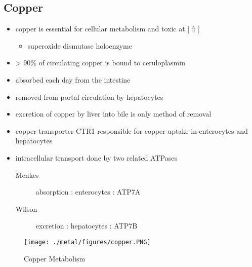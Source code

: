 \documentclass{scrartcl}
\begin{document}
\subsection{Copper}
\label{sec:org5c37294}
\begin{itemize}
\item copper is essential for cellular metabolism and toxic at [\(\Uparrow\)]
\begin{itemize}
\item superoxide dismutase holoenzyme
\end{itemize}
\item \textgreater{} 90\% of circulating copper is bound to ceruloplasmin
\item absorbed each day from the intestine
\item removed from portal circulation by hepatocytes
\item excretion of copper by liver into bile is only method of removal
\item copper transporter CTR1 responsible for copper uptake in enterocytes and hepatocytes
\item intracellular transport done by two related ATPases
\begin{description}
\item[{Menkes}] absorption : enterocytes : ATP7A
\item[{Wilson}] excretion : hepatocytes : ATP7B
\end{description}
\end{itemize}

\begin{figure}[htbp]
\centering
\texttt{[image: ./metal/figures/copper.PNG]}
\caption[copper]{\label{fig:org510b4d5}
Copper Metabolism}
\end{figure}
\end{document}
